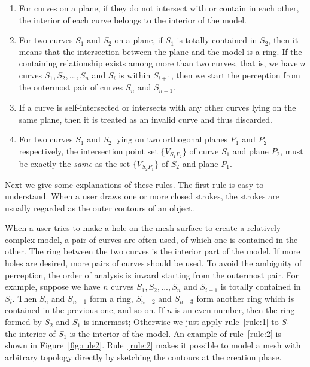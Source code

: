 \begin{enumerate}
	\item For curves on a plane, if they do not intersect with or contain in each other, the interior of each curve belongs to the interior of the model.
	\label{rule:1}
	\item For two curves $S_1$ and $S_2$ on a plane, if $S_1$ is totally contained in $S_2$, then it means that the intersection between the plane and the model is a ring. If the containing relationship exists among more than two curves, that is, we have $n$ curves $S_1,S_2,...,S_n$ and $S_i$ is within $S_{i+1}$, then we start the perception from the outermost pair of curves $S_n$ and $S_{n-1}$.
	\label{rule:2}
	\item If a curve is self-intersected or intersects with any other curves lying on the same
plane, then it is treated as an invalid curve and thus discarded.
	\label{rule:3}
	\item For two curves $S_1$ and $S_2$ lying on two orthogonal planes $P_1$ and $P_2$ respectively, the intersection point set $\{V_{S_1P_2}\}$ of curve $S_1$ and plane $P_2$, must be exactly the \emph{same} as the set $\{V_{S_2P_1}\}$ of $S_2$ and plane $P_1$.
	\label{rule:4}
\end{enumerate}

Next we give some explanations of these rules. The first rule is easy to understand. When a user draws one or more closed strokes, the strokes are usually regarded as the outer contours of an object.

When a user tries to make a hole on the mesh surface to create a relatively complex model, a pair of curves are often used, of which one is contained in the other. The ring between the two curves is the interior part of the model. If more holes are desired, more pairs of curves should be used. To avoid the ambiguity of perception, the order of analysis is inward starting from the outermost pair. For example, suppose we have $n$ curves $S_1,S_2,...,S_n$ and $S_{i-1}$ is totally contained in  $S_i$. Then $S_n$ and $S_{n-1}$ form a ring, $S_{n-2}$ and $S_{n-3}$ form another ring which is contained in the previous one, and so on. If $n$ is an even number, then the ring formed by $S_2$ and $S_1$ is innermost; Otherwise we just apply rule~\ref{rule:1} to $S_1$ -- the interior of $S_1$ is the interior of the model. An example of rule~\ref{rule:2} is shown in Figure~\ref{fig:rule2}. Rule~\ref{rule:2} makes it possible to model a mesh with arbitrary topology directly by sketching the contours at the creation phase.

